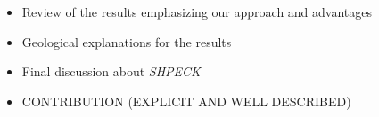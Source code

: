 \documentclass[ppgc,mestrado,english]{iiufrgs}
\begin{document}
\begin{itemize}
\item Review of the results emphasizing our approach and advantages
\item  Geological explanations for the results
\item  Final discussion about \emph{SHPECK}
\item  CONTRIBUTION (EXPLICIT AND WELL DESCRIBED) 
\end{itemize}






\end{document}
